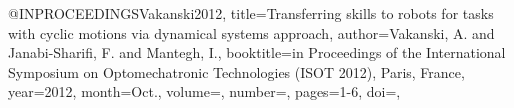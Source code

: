 @INPROCEEDINGS{Vakanski2012,
title={Transferring skills to robots for tasks with cyclic motions via dynamical systems approach},
author={Vakanski, A. and Janabi-Sharifi, F. and Mantegh, I.},
booktitle={in Proceedings of the International Symposium on Optomechatronic Technologies (ISOT 2012), Paris, France},
year={2012},
month={Oct.},
volume={},
number={},
pages={1-6},
doi={}, } 